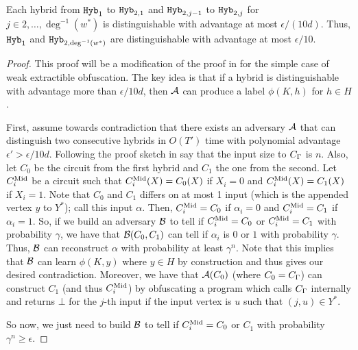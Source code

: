\begin{lemma}
	\label{lemma:hybB}
	Each hybrid from $\texttt{Hyb}_1$ to $\texttt{Hyb}_{2, 1}$ and $\texttt{Hyb}_{2, j - 1}$ to $\texttt{Hyb}_{2, j}$ for $j \in 2, \dots, \deg^{-1}(w^*)$
	is distinguishable with advantage at most $\epsilon / (10d)$. Thus, $\texttt{Hyb}_1$ and $\texttt{Hyb}_{2, \deg^{-1}(w^*)}$ are distinguishable with advantage at most $\epsilon / 10$.
	\begin{proof}
		This proof will be a modification of the proof in \cite{ishai2015public} for the simple case of weak extractible obfuscation.
		The key idea is that if a hybrid is distinguishable with advantage more than $\epsilon / 10d$, then
		$\mathcal{A}$ can produce a label $\phi(K, h)$ for $h \in H$.

		First, assume towards contradiction that there exists an adversary $\mathcal{A}$ that can distinguish two consecutive hybrids
		in $O(T')$ time
		with polynomial advantage $\epsilon' > \epsilon / 10d$.
		Following the proof sketch in \cite{ishai2015public} say that the input size to $C_\Gamma$ is $n$.
		Also, let $C_0$ be the circuit from the first hybrid and $C_1$ the one from the second.
		Let $C^{\text{Mid}}_i$ be a circuit such that $C^{\text{Mid}}_i(X) = C_0(X)$ if $X_i = 0$ and $C^{\text{Mid}}_i(X) = C_1(X)$ if $X_i = 1$.
		Note that $C_0$ and $C_1$ differs on at most 1 input (which is the appended vertex $y$ to $Y^*$);
		call this input $\alpha$.
		Then, $C^{\text{Mid}}_i = C_0$ if $\alpha_i = 0$ and $C^{\text{Mid}}_i = C_1$ if $\alpha_i = 1$.
		So, if we build an adversary $\mathcal{B}$ to tell if $C^{\text{Mid}}_i = C_0$ or $C^{\text{Mid}}_i = C_1$ with probability $\gamma$,
		we have that $\mathcal{B}(C_0, C_1)$ can tell if $\alpha_i$ is $0$ or $1$ with probability $\gamma$.
		Thus, $\mathcal{B}$ can reconstruct $\alpha$ with probability at least $\gamma^n$.
		Note that this implies that $\mathcal{B}$ can learn $\phi(K, y)$ where $y \in H$ by construction
		and thus gives our desired contradiction.
		Moreover, we have that $\mathcal{A}(C_0)$ (where $C_0 = C_\Gamma$) can construct $C_1$ (and thus $C^{\text{Mid}}_i$)
		by obfuscating a program which calls $C_\Gamma$ internally and returns $\bot$ for the $j$-th input
		if the input vertex is $u$ such that $(j, u) \in Y^*$.

		So now, we just need to build $\mathcal{B}$ to tell if $C^{\text{Mid}}_i = C_0$ or $C_1$ with probability $\gamma^n \geq \epsilon$.


\end{proof}
\end{lemma}
